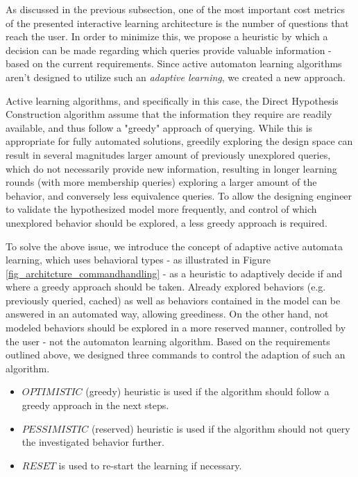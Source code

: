 As discussed in the previous subsection, one of the most important cost metrics of the presented interactive learning architecture is the number of questions that reach the user. In order to minimize this, we propose a heuristic by which a decision can be made regarding which queries provide valuable information - based on the current requirements. Since active automaton learning algorithms aren't designed to utilize such an \textit{adaptive learning}, we created a new approach. 

Active learning algorithms, and specifically in this case, the Direct Hypothesis Construction algorithm assume that the information they require are readily available, and thus follow a "greedy" approach of querying. While this is appropriate for fully automated solutions, greedily exploring the design space can result in several magnitudes larger amount of previously unexplored queries, which do not necessarily provide new information, resulting in longer learning rounds (with more membership queries) exploring a larger amount of the behavior, and conversely less equivalence queries. To allow the designing engineer to validate the hypothesized model more frequently, and control of which unexplored behavior should be explored, a less greedy approach is required.

To solve the above issue, we introduce the concept of adaptive active automata learning, which uses behavioral types - as illustrated in Figure \ref{fig_architcture_commandhandling} - as a heuristic to adaptively decide if and where a greedy approach should be taken. Already explored behaviors (e.g. previously queried, cached) as well as behaviors contained in the model can be answered in an automated way, allowing greediness. On the other hand, not modeled behaviors should be explored in a more reserved manner, controlled by the user - not the automaton learning algorithm. Based on the requirements outlined above, we designed three commands to control the adaption of such an algorithm.

\begin{itemize}
	\item $OPTIMISTIC$ (greedy) heuristic is used if the algorithm should follow a greedy approach in the next steps.
	\item $PESSIMISTIC$ (reserved) heuristic is used if the algorithm should not query the investigated behavior further.
	\item $RESET$ is used to re-start the learning if necessary.
\end{itemize}

